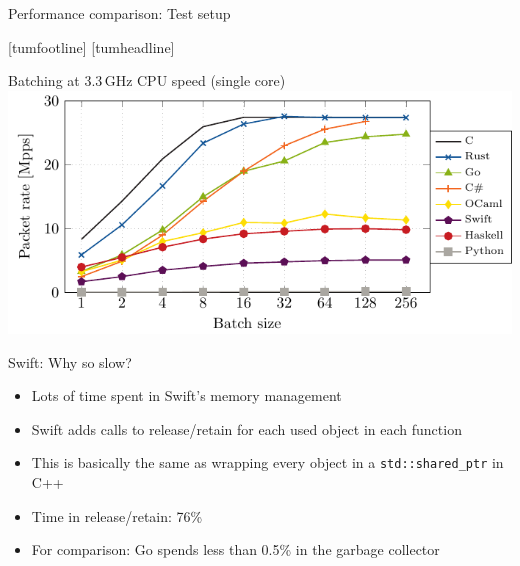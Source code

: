\documentclass[NET,english,aspectratio=169,notitleframe]{tumbeamer}
\begin{document}

\begin{frame}{Performance comparison: Test setup}
\centering
\end{frame}
[tumfootline]
[tumheadline]



\begin{frame}{Batching at 3.3\,GHz CPU speed (single core)}
\centering\includegraphics[scale=1]{figures/batches-33.pdf}
\end{frame}

%
\begin{frame}{Swift: Why so slow?}
\begin{itemize}
\item Lots of time spent in Swift's memory management
\item Swift adds calls to release/retain for each used object in each function
\item This is basically the same as wrapping every object in a \texttt{std::shared\_ptr} in C++
\vspace{1em}
\pause
\item Time in release/retain: 76\%
\item For comparison: Go spends less than 0.5\% in the garbage collector
\end{itemize}
\end{frame}
\end{document}
